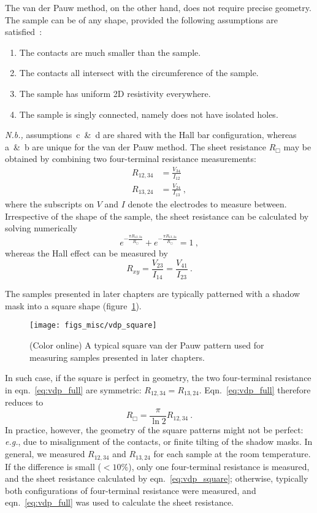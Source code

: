 The van der Pauw method, on the other hand, does not require precise geometry. The sample can be of any shape, provided the following assumptions are satisfied~\cite{VdP1958}:%
\begin{enumerate}[label={\alph*)}]
    \item The contacts are much smaller than the sample.
    \item The contacts all intersect with the circumference of the sample.
    \item The sample has uniform 2D resistivity everywhere.
    \item The sample is singly connected, namely does not have isolated holes.
\end{enumerate}%
\textit{N.b.,} assumptions~c~\&~d are shared with the Hall bar configuration, whereas a~\&~b are unique for the van der Pauw method. The sheet resistance $R_\Box$ may be obtained by combining two four-terminal resistance measurements: %
\begin{align}
    R_{12,34} &= \frac{V_{34}}{I_{12}}\nonumber\\
    R_{13,24} &= \frac{V_{24}}{I_{13}}~,
\end{align}%
where the subscripts on $V$ and $I$ denote the electrodes to measure between. Irrespective of the shape of the sample, the sheet resistance can be calculated by solving numerically%
\begin{equation}\label{eq:vdp_full}
	e^{-\frac{\pi{}R_{12,34}}{R_\Box}} + e^{-\frac{\pi{}R_{13,24}}{R_\Box}} = 1~,
\end{equation}
whereas the Hall effect can be measured by
\begin{equation}\label{eq:vdp_hall}
	R_{xy} = \frac{V_{23}}{I_{14}} = \frac{V_{41}}{I_{23}}~.
\end{equation}

The samples presented in later chapters are typically patterned with a shadow mask into a square shape (figure~\ref{fig:vdp_square}). %
\begin{figure}[ht]%
	\centering%
    \texttt{[image: figs\_misc/vdp\_square]}%
    \caption[A typical square van der Pauw pattern]{\label{fig:vdp_square}(Color online) A typical square van der Pauw pattern used for measuring samples presented in later chapters.}%
\end{figure}%
In such case, if the square is perfect in geometry, the two four-terminal resistance in eqn.~\ref{eq:vdp_full} are symmetric: $R_{12,34} = R_{13,24}$. Eqn.~\ref{eq:vdp_full} therefore reduces to%
\begin{equation}\label{eq:vdp_square}
	{R_\Box} = \frac{\pi}{\ln{2}}R_{12,34}~.
\end{equation}%
In practice, however, the geometry of the square patterns might not be perfect: \textit{e.g.}, due to misalignment of the contacts, or finite tilting of the shadow masks. In general, we measured $R_{12,34}$ and $R_{13,24}$ for each sample at the room temperature. If the difference is small ($<10\%$), only one four-terminal resistance is measured, and the sheet resistance calculated by eqn.~\ref{eq:vdp_square}; otherwise, typically both configurations of four-terminal resistance were measured, and eqn.~\ref{eq:vdp_full} was used to calculate the sheet resistance.

